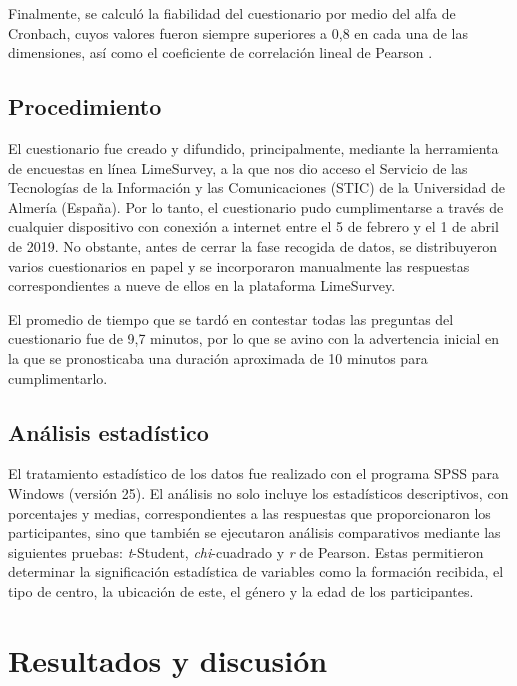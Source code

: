 \documentclass[spanish]{textolivre}
\begin{document}
Finalmente, se calculó la fiabilidad del cuestionario por medio del alfa de Cronbach, cuyos valores fueron siempre superiores a 0,8 en cada una de las dimensiones, así como el coeficiente de correlación lineal de Pearson \cite{de_amo_diseno_nodate}.

\subsection{Procedimiento}\label{sec-fmt-manuscrito}
El cuestionario fue creado y difundido, principalmente, mediante la herramienta de encuestas en línea LimeSurvey, a la que nos dio acceso el Servicio de las Tecnologías de la Información y las Comunicaciones (STIC) de la Universidad de Almería (España). Por lo tanto, el cuestionario pudo cumplimentarse a través de cualquier dispositivo con conexión a internet entre el 5 de febrero y el 1 de abril de 2019. No obstante, antes de cerrar la fase recogida de datos, se distribuyeron varios cuestionarios en papel y se incorporaron manualmente las respuestas correspondientes a nueve de ellos en la plataforma LimeSurvey.

El promedio de tiempo que se tardó en contestar todas las preguntas del cuestionario fue de 9,7 minutos, por lo que se avino con la advertencia inicial en la que se pronosticaba una duración aproximada de 10 minutos para cumplimentarlo. 

\subsection{Análisis estadístico}\label{sec-formato}
El tratamiento estadístico de los datos fue realizado con el programa SPSS para Windows (versión 25). El análisis no solo incluye los estadísticos descriptivos, con porcentajes y medias, correspondientes a las respuestas que proporcionaron los participantes, sino que también se ejecutaron análisis comparativos mediante las siguientes pruebas: \textit{t}-Student, \textit{chi}-cuadrado y \textit{r} de Pearson. Estas permitieron determinar la significación estadística de variables como la formación recibida, el tipo de centro, la ubicación de este, el género y la edad de los participantes.

\section{Resultados y discusión}\label{sec-modelo}
\end{document}

